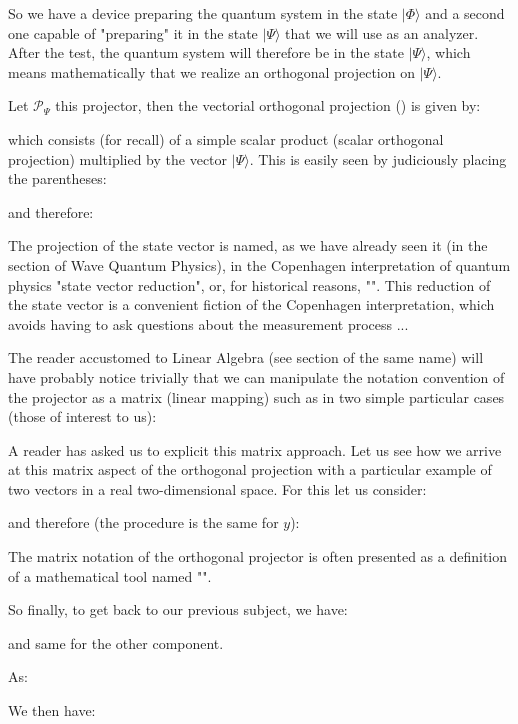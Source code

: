 	So we have a device preparing the quantum system in the state $|\Phi\rangle$ and a second one capable of "preparing" it in the state $|\Psi\rangle$ that we will use as an analyzer. After the test, the quantum system will therefore be in the state $|\Psi\rangle$, which means mathematically that we realize an orthogonal projection on $|\Psi\rangle$.

	Let $\mathcal{P}_\Psi$ this projector, then the vectorial orthogonal projection () is given by:
	
	which consists (for recall) of a simple scalar product (scalar orthogonal projection) multiplied by the vector $|\Psi\rangle$. This is easily seen by judiciously placing the parentheses:
	
	and therefore:
	
	The projection of the state vector is named, as we have already seen it (in the section of Wave Quantum Physics), in the Copenhagen interpretation of quantum physics "state vector reduction", or, for historical reasons, "". This reduction of the state vector is a convenient fiction of the Copenhagen interpretation, which avoids having to ask questions about the measurement process ...

	The reader accustomed to Linear Algebra (see section of the same name) will have probably notice trivially that we can manipulate the notation convention of the projector as a matrix (linear mapping) such as in two simple particular cases (those of interest to us):
	
	A reader has asked us to explicit this matrix approach. Let us see how we arrive at this matrix aspect of the orthogonal projection with a particular example of two vectors in a real two-dimensional space. For this let us consider:
	
	and therefore (the procedure is the same for $y$):
	
	\begin{tcolorbox}[title=Remark,colframe=black,arc=10pt]
	The matrix notation of the orthogonal projector is often presented as a definition of a mathematical tool named "".
	\end{tcolorbox}
	So finally, to get back to our previous subject, we have:
	
	and same for the other component.
	
	As:
	
	We then have:
	
